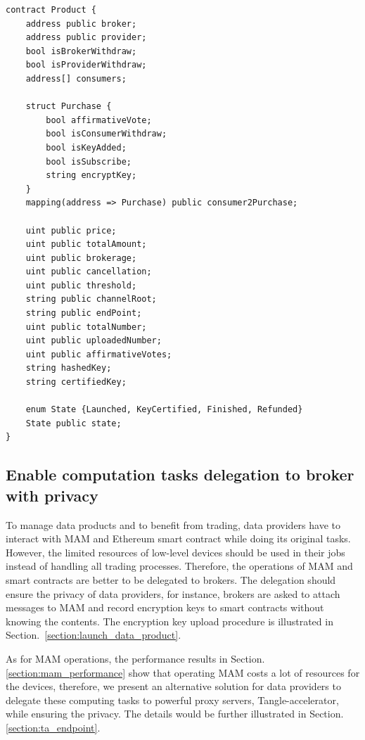 \documentclass[conference]{IEEEtran}
\begin{document}
\lstset{style=solidity}
\begin{lstlisting}[caption={Product Contract data fields}, label={lst:constructor}, frame=single]
contract Product {
    address public broker;
    address public provider;
    bool isBrokerWithdraw;
    bool isProviderWithdraw;
    address[] consumers;
    
    struct Purchase {
        bool affirmativeVote;
        bool isConsumerWithdraw;
        bool isKeyAdded;
        bool isSubscribe;
        string encryptKey;
    }
    mapping(address => Purchase) public consumer2Purchase;
    
    uint public price;
    uint public totalAmount;
    uint public brokerage;
    uint public cancellation;
    uint public threshold;
    string public channelRoot;
    string public endPoint;
    uint public totalNumber;
    uint public uploadedNumber;
    uint public affirmativeVotes;
    string hashedKey;
    string certifiedKey;
    
    enum State {Launched, KeyCertified, Finished, Refunded}
    State public state;
}
\end{lstlisting}

\subsection{Enable computation tasks delegation to broker with privacy}
To manage data products and to benefit from trading, data providers have to interact with MAM and Ethereum smart contract while doing its original tasks. However, the limited resources of low-level devices should be used in their jobs instead of handling all trading processes. Therefore, the operations of MAM and smart contracts are better to be delegated to brokers. The delegation should ensure the privacy of data providers, for instance, brokers are asked to attach messages to MAM and record encryption keys to smart contracts without knowing the contents. The encryption key upload procedure is illustrated in Section.~\ref{section:launch_data_product}.

As for MAM operations, the performance results in Section.\ref{section:mam_performance} show that operating MAM costs a lot of resources for the devices, therefore, we present an alternative solution for data providers to delegate these computing tasks to powerful proxy servers, Tangle-accelerator\cite{TA}, while ensuring the privacy. The details would be further illustrated in Section.\ref{section:ta_endpoint}.
\end{document}
